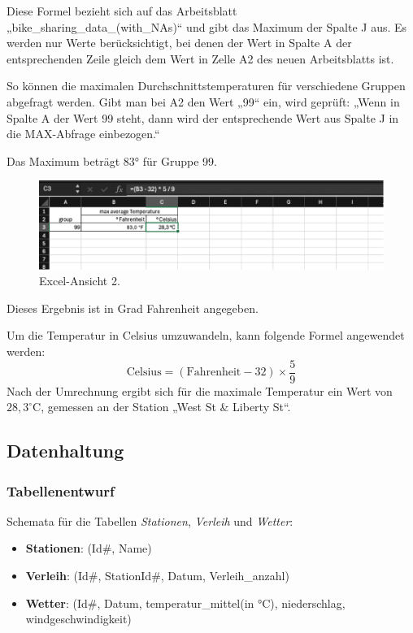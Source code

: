 \documentclass[a4paper,12pt]{article}
\begin{document}
Diese Formel bezieht sich auf das Arbeitsblatt „bike\_sharing\_data\_(with\_NAs)“ und gibt das Maximum der Spalte J aus. Es werden nur Werte berücksichtigt, bei denen der Wert in Spalte A der entsprechenden Zeile gleich dem Wert in Zelle A2 des neuen Arbeitsblatts ist.

So können die maximalen Durchschnittstemperaturen für verschiedene Gruppen abgefragt werden. Gibt man bei A2 den Wert „99“ ein, wird geprüft:
„Wenn in Spalte A der Wert 99 steht, dann wird der entsprechende Wert aus Spalte J in die MAX-Abfrage einbezogen.“

Das Maximum beträgt 83° für Gruppe 99.

\begin{figure}[h!]
    \centering
\includegraphics[width=\textwidth]{Comet_Snap_2.png}
    \caption{Excel-Ansicht 2.}
    \label{fig:example}
\end{figure}

Dieses Ergebnis ist in Grad Fahrenheit angegeben.


Um die Temperatur in Celsius umzuwandeln, kann folgende Formel angewendet werden:
\[
\text{Celsius} = (\text{Fahrenheit} - 32) \times \frac{5}{9}
\]
Nach der Umrechnung ergibt sich für die maximale Temperatur ein Wert von \( 28,3^\circ \mathrm{C} \), gemessen an der Station „West St \& Liberty St“.

\newpage

\subsection{Datenhaltung}
\subsubsection{Tabellenentwurf}
Schemata für die Tabellen \textit{Stationen}, \textit{Verleih} und \textit{Wetter}:

\begin{itemize}
    \item \textbf{Stationen}: (Id\#, Name)
    \item \textbf{Verleih}: (Id\#, StationId\#, Datum, Verleih\_anzahl)
    \item \textbf{Wetter}: (Id\#, Datum, temperatur\_mittel(in °C), niederschlag, windgeschwindigkeit)
\end{itemize}
\end{document}
